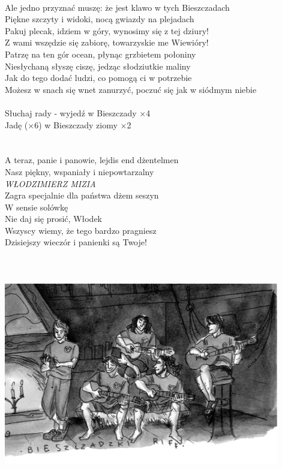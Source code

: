 \documentclass[a5paper, 10pt]{book}
\begin{document}
\newpage
\begin{minipage}[t]{1\textwidth}
  ~\\
  Ale jedno przyznać muszę: że jest klawo w tych Bieszczadach\\
  Piękne szczyty i widoki, nocą gwiazdy na plejadach\\
  Pakuj plecak, idziem w góry, wynosimy się z tej dziury!\\
  Z wami wszędzie się zabiorę, towarzyskie me Wiewióry!\\
  \hspace*{3mm}Patrzę na ten gór ocean, płynąc grzbietem połoniny\\
  \hspace*{3mm}Niesłychaną słyszę ciszę, jedząc słodziutkie maliny\\
  \hspace*{3mm}Jak do tego dodać ludzi, co pomogą ci w potrzebie\\
  \hspace*{3mm}Możesz w snach się wnet zanurzyć, poczuć się jak w siódmym niebie\\
  \\
  \hspace*{10mm}Słuchaj rady - wyjedź w Bieszczady $\times$4\\
  \hspace*{10mm}Jadę ($\times$6) w Bieszczady ziomy $\times$2\\
  \\
  \\
  A teraz, panie i panowie, lejdis end dżentelmen\\
  Nasz piękny, wspaniały i niepowtarzalny\\
  \hspace*{4mm}\textit{\large WŁODZIMIERZ MIZIA}\\
  Zagra specjalnie dla państwa dżem seszyn\\
  W sensie solówkę\\
  Nie daj się prosić, Włodek\\
  Wszyscy wiemy, że tego bardzo pragniesz\\
  Dzisiejszy wieczór i panienki są Twoje!\\
  \\
  \\
  \\
  \includegraphics[width=12cm]{images/bieszczadzki_riff.png}
\end{minipage}
\end{document}
